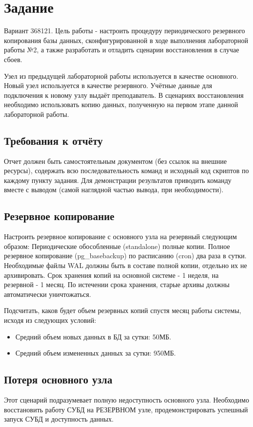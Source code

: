\section{Задание}
Вариант 368121.
Цель работы - настроить процедуру периодического резервного копирования базы данных, сконфигурированной в ходе выполнения лабораторной работы №2, а также разработать и отладить сценарии восстановления в случае сбоев.

Узел из предыдущей лабораторной работы используется в качестве основного. Новый узел используется в качестве резервного. Учётные данные для подключения к новому узлу выдаёт преподаватель. В сценариях восстановления необходимо использовать копию данных, полученную на первом этапе данной лабораторной работы.

\subsection{Требования к отчёту}
Отчет должен быть самостоятельным документом (без ссылок на внешние ресурсы), содержать всю последовательность команд и исходный код скриптов по каждому пункту задания. Для демонстрации результатов приводить команду вместе с выводом (самой наглядной частью вывода, при необходимости).

\subsection{Резервное копирование}
Настроить резервное копирование с основного узла на резервный следующим образом:
Периодические обособленные (standalone) полные копии.
Полное резервное копирование (pg\_basebackup) по расписанию (cron) два раза в сутки. Необходимые файлы WAL должны быть в составе полной копии, отдельно их не архивировать. Срок хранения копий на основной системе - 1 неделя, на резервной - 1 месяц. По истечении срока хранения, старые архивы должны автоматически уничтожаться.

Подсчитать, каков будет объем резервных копий спустя месяц работы системы, исходя из следующих условий:

\begin{itemize}
    \item Средний объем новых данных в БД за сутки: 50МБ.
    \item Средний объем измененных данных за сутки: 950МБ.
\end{itemize}

\subsection{Потеря основного узла}
Этот сценарий подразумевает полную недоступность основного узла.
Необходимо восстановить работу СУБД на РЕЗЕРВНОМ узле,
продемонстрировать успешный запуск СУБД и доступность данных.

